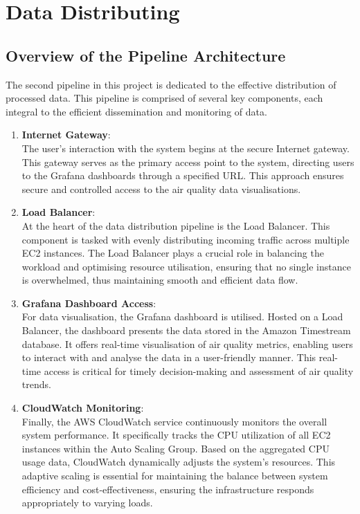 \documentclass[12pt,oneside]{book} %
\begin{document}
\newpage
\section{Data Distributing}

\subsection{Overview of the Pipeline Architecture}
The second pipeline in this project is dedicated to the effective distribution
of processed data. This pipeline is comprised of several key components, each
integral to the efficient dissemination and monitoring of data.

\begin{enumerate}
    \item \textbf{Internet Gateway}: \\
          The user's interaction with the system begins at the secure Internet gateway. This gateway serves as the primary access point to the system, directing users to the Grafana dashboards through a specified URL. This approach ensures secure and controlled access to the air quality data visualisations.

    \item \textbf{Load Balancer}: \\
          At the heart of the data distribution pipeline is the Load Balancer. This component is tasked with evenly distributing incoming traffic across multiple EC2 instances. The Load Balancer plays a crucial role in balancing the workload and optimising resource utilisation, ensuring that no single instance is overwhelmed, thus maintaining smooth and efficient data flow.

    \item \textbf{Grafana Dashboard Access}: \\
          For data visualisation, the Grafana dashboard is utilised. Hosted on a Load Balancer, the dashboard presents the data stored in the Amazon Timestream database. It offers real-time visualisation of air quality metrics, enabling users to interact with and analyse the data in a user-friendly manner. This real-time access is critical for timely decision-making and assessment of air quality trends.
    \item \textbf{CloudWatch Monitoring}: \\
          Finally, the AWS CloudWatch service continuously monitors the overall system performance. It specifically tracks the CPU utilization of all EC2 instances within the Auto Scaling Group. Based on the aggregated CPU usage data, CloudWatch dynamically adjusts the system's resources. This adaptive scaling is essential for maintaining the balance between system efficiency and cost-effectiveness, ensuring the infrastructure responds appropriately to varying loads.
\end{enumerate}
\end{document}
